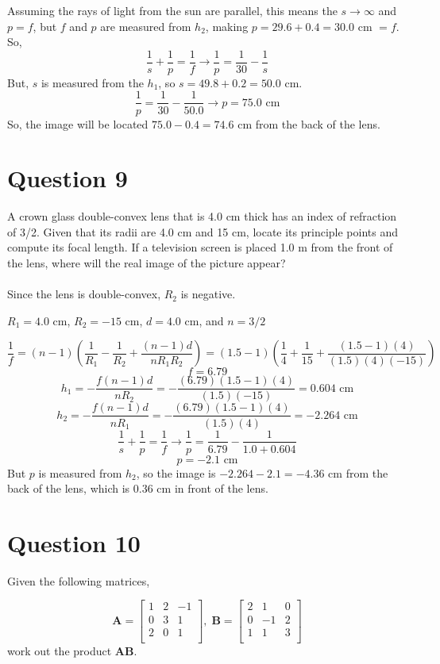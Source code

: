 \documentclass[a4paper]{article}
\begin{document}
Assuming the rays of light from the sun are parallel, this means the $s \rightarrow \infty$ and $p=f$, but $f$ and $p$ are measured from $h_2$, making
$p = 29.6 + 0.4 = 30.0$ cm $=f$. So,
$$ \frac{1}{s} + \frac{1}{p} = \frac{1}{f} \rightarrow \frac{1}{p} = \frac{1}{30} - \frac{1}{s}$$
But, $s$ is measured from the $h_1$, so $s = 49.8 + 0.2 = 50.0$ cm.
$$ \frac{1}{p} = \frac{1}{30} - \frac{1}{50.0} \rightarrow p=75.0 \textrm{ cm}$$
So, the image will be located $75.0 - 0.4=74.6$ cm from the back of the lens.

\section*{Question 9}
A crown glass double-convex lens that is 4.0 cm thick has an index of refraction of 3/2. Given that
its radii are 4.0 cm and 15 cm, locate its principle points and compute its focal length. If a television
screen is placed 1.0 m from the front of the lens, where will the real image of the picture appear?\\\\

Since the lens is double-convex, $R_2$ is negative.
\begin{center}
    $R_1 = 4.0$ cm, $R_2 = -15$ cm, $d = 4.0$ cm, and $n = 3/2$
\end{center}
$$ \frac{1}{f} = (n - 1) \left(\frac{1}{R_1} - \frac{1}{R_2} + \frac{(n-1)d}{nR_1 R_2}\right) = (1.5 - 1) \left(\frac{1}{4} + \frac{1}{15} + \frac{(1.5-1)(4)}{(1.5)(4)(-15)}\right)$$
$$ f = 6.79 $$
$$ h_1 = - \frac{f(n-1)d}{nR_2} = - \frac{(6.79)(1.5-1)(4)}{(1.5)(-15)} = 0.604 \textrm{ cm}$$
$$ h_2 = - \frac{f(n-1)d}{nR_1} = - \frac{(6.79)(1.5-1)(4)}{(1.5)(4)} = -2.264 \textrm{ cm}$$
$$ \frac{1}{s} + \frac{1}{p} = \frac{1}{f} \rightarrow \frac{1}{p} = \frac{1}{6.79} - \frac{1}{1.0 + 0.604}$$
$$ p = -2.1 \textrm{ cm}$$
But $p$ is measured from $h_2$, so the image is $-2.264 - 2.1 = -4.36$ cm from the back of the lens, which is 0.36 cm in front of the lens.

\section*{Question 10}
Given the following matrices,

$$ 
\bm{A} = \begin{bmatrix}
    1 & 2 & -1 \\
    0 & 3 & 1 \\
    2 & 0 & 1 \\
\end{bmatrix},\;
\bm{B} = \begin{bmatrix}
    2 & 1 & 0 \\
    0 & -1 & 2 \\
    1 & 1 & 3 \\
\end{bmatrix} $$
work out the product $\bm{A}\bm{B}$.\\\\
\end{document}
